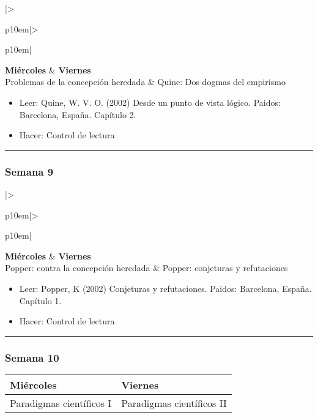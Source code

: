 \documentclass[spanish,]{article}
\begin{document}
\begin{tabular}{|>{\raggedright\arraybackslash}p{10em}|>{\raggedright\arraybackslash}p{10em}|}
\hline
\textbf{Miércoles} & \textbf{Viernes}\\
\hline
Problemas de la concepción heredada & Quine: Dos dogmas del empirismo\\
\hline
\end{tabular}

\begin{itemize}
\item
  Leer: Quine, W. V. O. (2002) Desde un punto de vista lógico. Paidos:
  Barcelona, España. Capítulo 2.
\item
  Hacer: Control de lectura
\end{itemize}

\begin{center}\rule{0.5\linewidth}{\linethickness}\end{center}

\subsubsection{Semana 9}\label{semana-9}

\begin{tabular}{|>{\raggedright\arraybackslash}p{10em}|>{\raggedright\arraybackslash}p{10em}|}
\hline
\textbf{Miércoles} & \textbf{Viernes}\\
\hline
Popper: contra la concepción heredada & Popper: conjeturas y refutaciones\\
\hline
\end{tabular}

\begin{itemize}
\item
  Leer: Popper, K (2002) Conjeturas y refutaciones. Paidos: Barcelona,
  España. Capítulo 1.
\item
  Hacer: Control de lectura
\end{itemize}

\begin{center}\rule{0.5\linewidth}{\linethickness}\end{center}

\subsubsection{Semana 10}\label{semana-10}

\begin{tabular}{|>{\raggedright\arraybackslash}p{10em}|>{\raggedright\arraybackslash}p{10em}|}
\hline
\textbf{Miércoles} & \textbf{Viernes}\\
\hline
Paradigmas científicos I & Paradigmas científicos II\\
\hline
\end{tabular}
\end{document}
